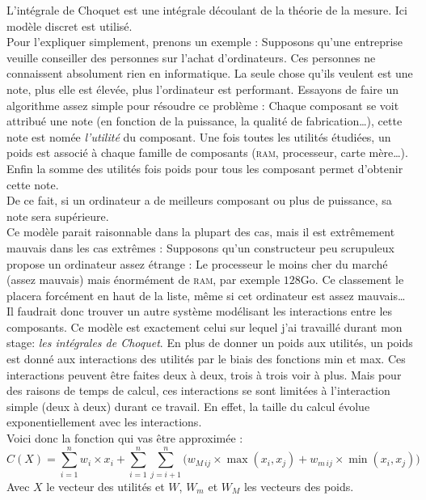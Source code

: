 
L'intégrale de Choquet est une intégrale découlant de la théorie de la mesure\cite{artch}.
Ici modèle discret est utilisé.\\


Pour l'expliquer simplement, prenons un exemple :
Supposons qu'une entreprise veuille conseiller des personnes sur l'achat d'ordinateurs.
Ces personnes ne connaissent absolument rien en informatique.
La seule chose qu'ils veulent est une note, plus elle est élevée, plus l'ordinateur est performant.
Essayons de faire un algorithme assez simple pour résoudre ce problème :
Chaque composant se voit attribué une note (en fonction de la puissance, la qualité de fabrication\ldots),
cette note est nomée \textit{l'utilité} du composant.
Une fois toutes les utilités étudiées, un poids est associé à chaque famille de composants
(\textsc{ram}, processeur, carte mère\ldots).
Enfin la somme des utilités fois poids pour tous les composant permet d'obtenir cette note.\\
De ce fait, si un ordinateur a de meilleurs composant ou plus de puissance, sa note sera supérieure.\\


Ce modèle parait raisonnable dans la plupart des cas, mais il est extrêmement mauvais dans les cas extrêmes :
Supposons qu'un constructeur peu scrupuleux propose un ordinateur assez étrange :
Le processeur le moins cher du marché (assez mauvais) mais énormément de \textsc{ram}, par exemple $128$Go.
Ce classement le placera forcément en haut de la liste,
même si cet ordinateur est assez mauvais\ldots\\


Il faudrait donc trouver un autre système modélisant les interactions entre les composants.
Ce modèle est exactement celui sur lequel j'ai travaillé durant mon stage: \textit{les intégrales de Choquet}.
En plus de donner un poids aux utilités,
un poids est donné aux interactions des utilités par le biais des fonctions min et max.
Ces interactions peuvent être faites deux à deux, trois à trois voir à plus.
Mais pour des raisons de temps de calcul, ces interactions se sont limitées à l'interaction simple
(deux à deux) durant ce travail.
En effet, la taille du calcul évolue exponentiellement avec les interactions.\\


Voici donc la fonction qui vas être approximée :
\begin{equation}
    \label{eq:Choquet}
    C(X)  =
    \sum_{i=1}^{n}
        w_i \times x_i +
    \sum_{i=1}^{n}\sum_{j=i+1}^{n}
    \Big(
        w_{M\,ij} \times \max(x_i,x_j) + w_{m\,ij} \times \min(x_i,x_j)
    \Big)
\end{equation}
Avec $X$ le vecteur des utilités et $W$, $W_m$ et $W_M$ les vecteurs des poids.
